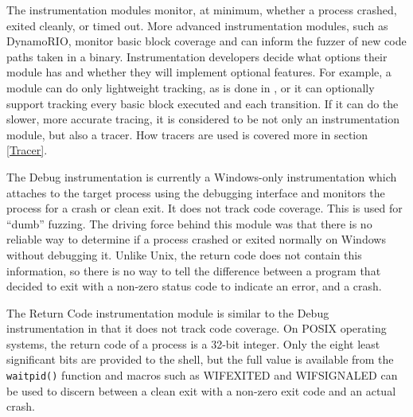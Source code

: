 The instrumentation modules monitor, at minimum, whether a process crashed,
exited cleanly, or timed out. More advanced instrumentation modules, such as
DynamoRIO, monitor basic block coverage and can inform the fuzzer of new code paths
taken in a binary.  Instrumentation developers decide what options their
module has and whether they will implement optional features. For example, a
module can do only lightweight tracking, as is done in \AFL{}, or it can
optionally support tracking every
basic block executed and each transition.  If it can do the slower, more
accurate tracing, it is considered to be not only an instrumentation module,
but also a tracer.  How tracers are used is covered more in section
\ref{Tracer}.

The Debug instrumentation is currently a Windows-only instrumentation which
attaches to the target process using the debugging interface and monitors the
process for a crash or clean exit.  It does not track code coverage.
This is used for ``dumb'' fuzzing.  The driving force behind this module was
that there is no reliable way to determine if a process crashed or exited normally
on Windows without debugging it.  Unlike Unix, the return code does not contain this information,
so there is no way to tell the difference between a program that decided to
exit with a non-zero status code to indicate an error, and a crash.

The Return Code instrumentation module is similar to the Debug instrumentation
in that it does not track code coverage. On POSIX operating systems, the return
code of a process is a 32-bit integer.  Only the eight least significant bits
are provided to the shell, but the full value is available from the
\texttt{waitpid()} function and macros such as WIFEXITED and WIFSIGNALED can be used to
discern between a clean exit with a non-zero exit code and an actual crash.

